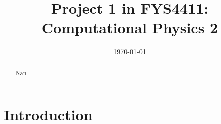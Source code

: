 \documentclass[11pt]{article}
\title{Project 1 in FYS4411: Computational Physics 2}
\author{}
\date{\today}
\begin{document}
\maketitle

\begin{abstract}
Nan
\end{abstract}

\section{Introduction}
\end{document}
